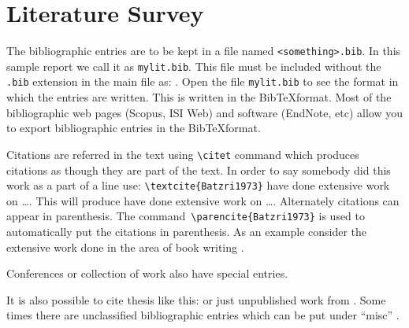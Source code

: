 
\chapter{Literature Survey}

The bibliographic entries are to be kept in a file named
\verb|<something>.bib|. In this sample report we call it as
\verb|mylit.bib|. This file must be included without the \verb|.bib|
extension in the main file as: \verb||.   Open the
file \verb|mylit.bib| to see the format in which the entries are
written. This is written in the Bib\TeX format. Most of the
bibliographic web pages (Scopus, ISI Web) and software (EndNote, etc)
allow you to export bibliographic entries in the Bib\TeX format.

Citations are referred in the text using \verb|\citet| command which produces citations as though they are part of the text.  In order to say
somebody did this work as a part of a line use:
\verb|\textcite{Batzri1973}| have done extensive work on \ldots.  This will produce
\textcite{Batzri1973} have done extensive work on \ldots. Alternately citations can appear in parenthesis.
The command~\verb|\parencite{Batzri1973}| is used to automatically put the
citations in parenthesis.  As an example consider the extensive work
done in the area of book writing \parencite{Sackmann1995a,Boal2012}.

Conferences \parencite{rich-mart92} or collection of work
\parencite{Sackmann1995a} also have special entries.

It is also possible to cite thesis like this:
\textcite{jariwala00,luding94} or just unpublished work from
\textcite{SunHI03}. Some times there are unclassified bibliographic
entries which can be put under ``misc'' \parencite{Smith99}.



